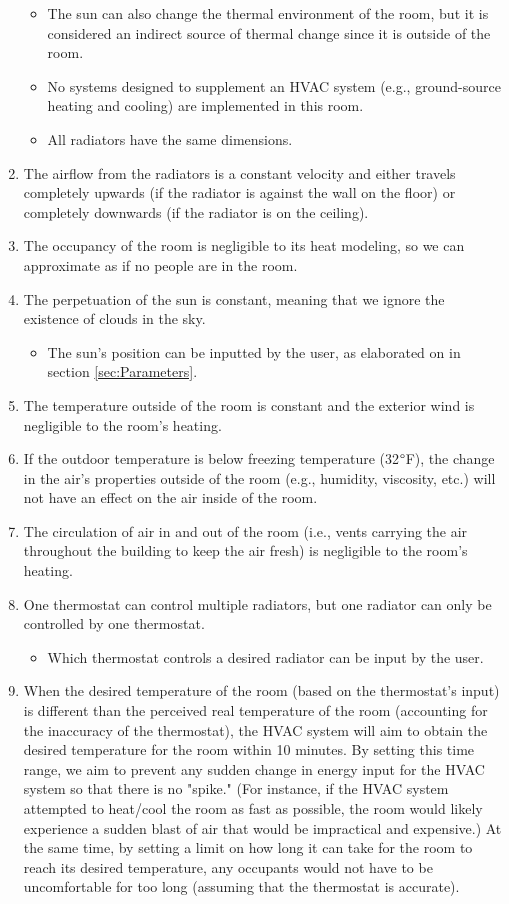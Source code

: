 \documentclass[conference,letterpaper]{IEEEtran}
\begin{document}
\begin{enumerate}
    \begin{itemize}
        \item The sun can also change the thermal environment of the room, but it is considered an indirect source of thermal change since it is outside of the room.
        \item No systems designed to supplement an HVAC system (e.g., ground-source heating and cooling) are implemented in this room.
        \item All radiators have the same dimensions.
    \end{itemize}
    \item The airflow from the radiators is a constant velocity and either travels completely upwards (if the radiator is against the wall on the floor) or completely downwards (if the radiator is on the ceiling).
    \item The occupancy of the room is negligible to its heat modeling, so we can approximate as if no people are in the room.
    \item The perpetuation of the sun is constant, meaning that we ignore the existence of clouds in the sky.
    \begin{itemize}
        \item The sun's position can be inputted by the user, as elaborated on in section \ref{sec:Parameters}.
    \end{itemize}
    \item The temperature outside of the room is constant and the exterior wind is negligible to the room's heating.
    \item If the outdoor temperature is below freezing temperature (32$\degree$F), the change in the air's properties outside of the room (e.g., humidity, viscosity, etc.) will not have an effect on the air inside of the room.
    \item  The circulation of air in and out of the room (i.e., vents carrying the air throughout the building to keep the air fresh) is negligible to the room's heating.
    \item One thermostat can control multiple radiators, but one radiator can only be controlled by one thermostat.
    \begin{itemize}
        \item Which thermostat controls a desired radiator can be input by the user.
    \end{itemize}
    \item When the desired temperature of the room (based on the thermostat's input) is different than the perceived real temperature of the room (accounting for the inaccuracy of the thermostat), the HVAC system will aim to obtain the desired temperature for the room within 10 minutes. By setting this time range, we aim to prevent any sudden change in energy input for the HVAC system so that there is no "spike." (For instance, if the HVAC system attempted to heat/cool the room as fast as possible, the room would likely experience a sudden blast of air that would be impractical and expensive.) At the same time, by setting a limit on how long it can take for the room to reach its desired temperature, any occupants would not have to be uncomfortable for too long (assuming that the thermostat is accurate).
\end{enumerate}
\end{document}
